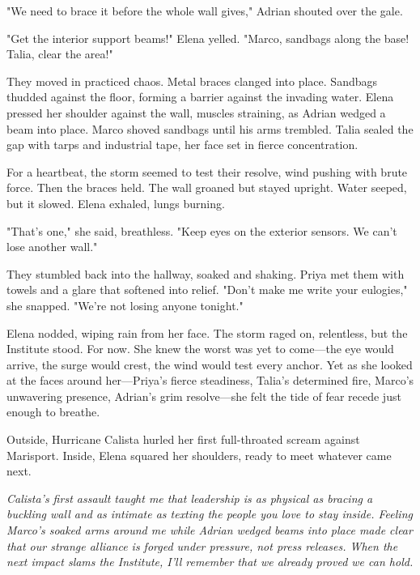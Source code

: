 "We need to brace it before the whole wall gives," Adrian shouted over the gale.

"Get the interior support beams!" Elena yelled. "Marco, sandbags along the base! Talia, clear the area!"

They moved in practiced chaos. Metal braces clanged into place. Sandbags thudded against the floor, forming a barrier against the invading water. Elena pressed her shoulder against the wall, muscles straining, as Adrian wedged a beam into place. Marco shoved sandbags until his arms trembled. Talia sealed the gap with tarps and industrial tape, her face set in fierce concentration.

For a heartbeat, the storm seemed to test their resolve, wind pushing with brute force. Then the braces held. The wall groaned but stayed upright. Water seeped, but it slowed. Elena exhaled, lungs burning.

"That's one," she said, breathless. "Keep eyes on the exterior sensors. We can't lose another wall."

They stumbled back into the hallway, soaked and shaking. Priya met them with towels and a glare that softened into relief. "Don't make me write your eulogies," she snapped. "We're not losing anyone tonight."

Elena nodded, wiping rain from her face. The storm raged on, relentless, but the Institute stood. For now. She knew the worst was yet to come—the eye would arrive, the surge would crest, the wind would test every anchor. Yet as she looked at the faces around her—Priya's fierce steadiness, Talia's determined fire, Marco's unwavering presence, Adrian's grim resolve—she felt the tide of fear recede just enough to breathe.

Outside, Hurricane Calista hurled her first full-throated scream against Marisport. Inside, Elena squared her shoulders, ready to meet whatever came next.

\noindent\textit{Calista's first assault taught me that leadership is as physical as bracing a buckling wall and as intimate as texting the people you love to stay inside. Feeling Marco's soaked arms around me while Adrian wedged beams into place made clear that our strange alliance is forged under pressure, not press releases. When the next impact slams the Institute, I'll remember that we already proved we can hold.}
